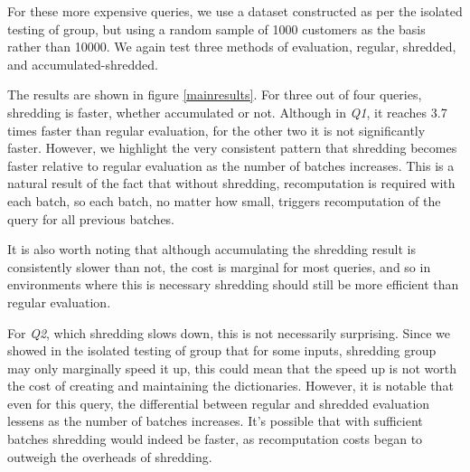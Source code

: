 For these more expensive queries, we use a dataset constructed as per the isolated testing of group, but using a random sample of 1000 customers as the basis rather than 10000. We again test three methods of evaluation, regular, shredded, and accumulated-shredded.

The results are shown in figure \ref{mainresults}. For three out of four queries, shredding is faster, whether accumulated or not. Although in \textit{Q1}, it reaches 3.7 times faster than regular evaluation, for the other two it is not significantly faster. However, we highlight the very consistent pattern that shredding becomes faster relative to regular evaluation as the number of batches increases. This is a natural result of the fact that without shredding, recomputation is required with each batch, so each batch, no matter how small, triggers recomputation of the query for all previous batches.

It is also worth noting that although accumulating the shredding result is consistently slower than not, the cost is marginal for most queries, and so in environments where this is necessary shredding should still be more efficient than regular evaluation.

For \textit{Q2}, which shredding slows down, this is not necessarily surprising. Since we showed in the isolated testing of group that for some inputs, shredding group may only marginally speed it up, this could mean that the speed up is not worth the cost of creating and maintaining the dictionaries. However, it is notable that even for this query, the differential between regular and shredded evaluation lessens as the number of batches increases. It's possible that with sufficient batches shredding would indeed be faster, as recomputation costs began to outweigh the overheads of shredding.

